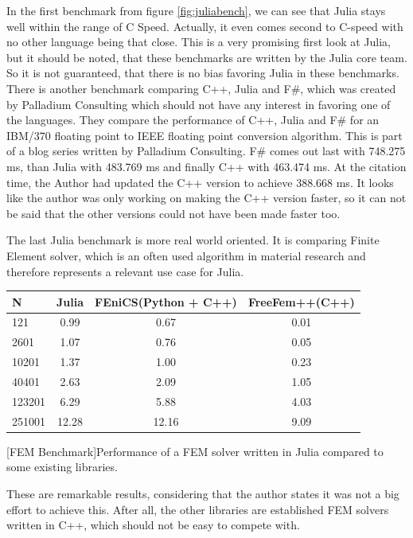 In the first benchmark from figure \ref{fig:juliabench}, we can see that Julia stays well within the range of C Speed. 
Actually, it even comes second to C-speed with no other language being that close.
This is a very promising first look at Julia, but it should be noted, that these benchmarks are written by the Julia core team.
So it is not guaranteed, that there is no bias favoring Julia in these benchmarks.
There is another benchmark comparing C++, Julia and F\#, which was created by Palladium Consulting which should not have any interest in favoring one of the languages.
They compare the performance of C++, Julia and F\# for an IBM/370 floating point to IEEE floating point conversion algorithm. This is part of a blog series\cite{JuliaFSCpp} written by Palladium Consulting.
F\# comes out last with 748.275 ms, than Julia with 483.769 ms and finally C++ with 463.474 ms. 
At the citation time, the Author had updated the C++ version to achieve 388.668 ms. 
It looks like the author was only working on making the C++ version faster, so it can not be said that the other versions could not have been made faster too.


The last Julia benchmark is more real world oriented. 
It is comparing Finite Element solver, which is an often used algorithm in material research and therefore represents a relevant use case for Julia.

\begin{table}[htbp]
    \centering
    \begin{tabular}{l|c|c|c}
        \hline
        \textbf{N}  & \textbf{Julia} & \textbf{FEniCS(Python + C++)}  & \textbf{FreeFem++(C++)}\\
        \hline
        121         & 0.99           & 0.67             & 0.01 \\
        2601        & 1.07           & 0.76             & 0.05 \\
        10201       & 1.37           & 1.00             & 0.23 \\
        40401       & 2.63           & 2.09             & 1.05 \\
        123201      & 6.29           & 5.88             & 4.03 \\
        251001      & 12.28          & 12.16            & 9.09 \\
        \hline
    \end{tabular}
    [FEM Benchmark]{Performance of a FEM solver written in Julia compared to some existing libraries. \cite{FMSolver}}
    \label{table:fembench}
\end{table}
These are remarkable results, considering that the author states it was not a big effort to achieve this. After all, the other libraries are established FEM solvers written in C++, which should not be easy to compete with.

